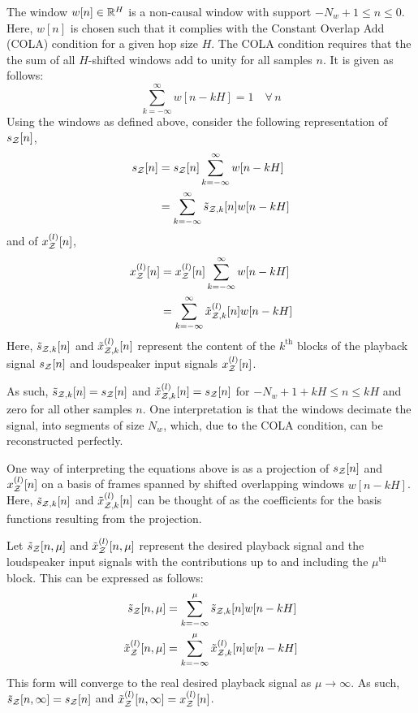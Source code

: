 The window $w[n]\in\mathbb{R}^{H}$ is a non-causal window with support $-N_w + 1 \leq n \leq 0$. 
Here, $w[n]$ is chosen such that it complies with the Constant Overlap Add (COLA) condition for a given hop size $H$.
The COLA condition requires that the the sum of all $H$-shifted windows add to unity for all samples $n$. 
It is given as follows:
\begin{equation}
     \sum_{k=-\infty}^{\infty} w[n - kH] = 1 \quad\forall\,n
\end{equation}
Using the windows as defined above, consider the following representation of $s_{\mathcal{Z}}[n]$,
\begin{equation}
    \begin{aligned}
        s_{\mathcal{Z}}[n] &= s_{\mathcal{Z}}[n]\sum_{k=-\infty}^{\infty} w[n - kH] \\
                 &= \sum_{k=-\infty}^{\infty} \tilde{s}_{\mathcal{Z},k}[n]w[n - kH]
    \end{aligned}
    \label{eq:perceptual_sound_zones:stft:block_based:desired_playback}
\end{equation}
and of $x^{(l)}_{\mathcal{Z}}[n]$,
\begin{equation}
    \begin{aligned}
        x^{(l)}_{\mathcal{Z}}[n] &= x^{(l)}_{\mathcal{Z}}[n]\sum_{k=-\infty}^{\infty} w[n - kH] \\
                       &= \sum_{k=-\infty}^{\infty} \tilde{x}^{(l)}_{\mathcal{Z},k}[n]w[n - kH]
    \end{aligned}
    \label{eq:perceptual_sound_zones:stft:block_based:loudspeaker_inputs}
\end{equation}
Here, $\tilde{s}_{\mathcal{Z},k}[n]$ and $\tilde{x}^{(l)}_{\mathcal{Z},k}[n]$ represent the content of the $k^\text{th}$ blocks of the playback signal $s_{\mathcal{Z}}[n]$ and loudspeaker input signals $x^{(l)}_{\mathcal{Z}}[n]$.

As such, $\tilde{s}_{\mathcal{Z},k}[n] = s_{\mathcal{Z}}[n]$ and $\tilde{x}^{(l)}_{\mathcal{Z},k}[n] = s_{\mathcal{Z}}[n]$ for $-N_w + 1 + kH \leq n \leq kH$ and zero for all other samples $n$.  
One interpretation is that the windows decimate the signal, into segments of size $N_w$, which, due to the COLA condition, can be reconstructed perfectly.

One way of interpreting the equations above is as a projection of $s_{\mathcal{Z}}[n]$ and $x^{(l)}_{\mathcal{Z}}[n]$ on a 
basis of frames spanned by shifted overlapping windows $w[n - kH]$.
Here, $\tilde{s}_{\mathcal{Z},k}[n]$ and $\tilde{x}^{(l)}_{\mathcal{Z},k}[n]$ can be thought of as the coefficients for the basis functions resulting from the projection.

Let $\tilde{s}_{\mathcal{Z}}[n, \mu]$ and $\tilde{x}^{(l)}_{\mathcal{Z}}[n, \mu]$ represent the desired playback signal and the loudspeaker input signals with the contributions up to and including the $\mu^\mathrm{th}$
block. 
This can be expressed as follows:
\begin{align}
    \tilde{s}_{\mathcal{Z}}[n, \mu] &= \sum_{k=-\infty}^{\mu} \tilde{s}_{\mathcal{Z},k}[n]w[n - kH] \\
    \tilde{x}^{(l)}_{\mathcal{Z}}[n, \mu] &= \sum_{k=-\infty}^{\mu} \tilde{x}^{(l)}_{\mathcal{Z},k}[n]w[n - kH]
\end{align}
This form will converge to the real desired playback signal as $\mu\to\infty$.
As such, $\tilde{s}_{\mathcal{Z}}[n, \infty] = s_{\mathcal{Z}}[n]$ and $\tilde{x}^{(l)}_{\mathcal{Z}}[n, \infty] = x^{(l)}_{\mathcal{Z}}[n]$.

